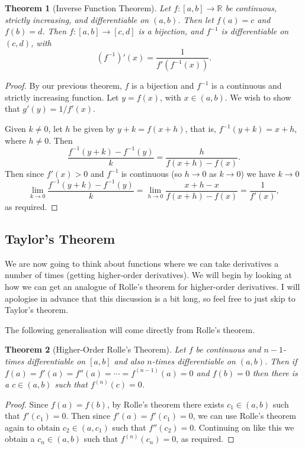 \documentclass[11pt, a4paper]{article}
\newtheorem{theorem}{Theorem}[section]
\theoremstyle{definition}
\newcommand{\R}{\mathbb{R}}
\begin{document}
\begin{theorem}[Inverse Function Theorem]
	Let $f:[a, b] \rightarrow \R$ be continuous, strictly increasing, and differentiable on $(a, b)$.
	Then let $f(a) = c$ and $f(b) = d$. Then $f:[a, b] \rightarrow [c, d]$ is a bijection, and $f^{-1}$ is differentiable on $(c, d)$, with
	$$
	(f^{-1})'(x) = \frac{1}{f'(f^{-1}(x))}.
	$$
\end{theorem}
\begin{proof}
	By our previous theorem, $f$ is a bijection and $f^{-1}$ is a continuous and strictly increasing function. Let $y = f(x)$, with $x \in (a, b)$. We wish to show that $g'(y) = 1/f'(x)$.

	Given $k \neq 0$, let $h$ be given by $y + k = f(x + h)$, that is, $f^{-1}(y + k) = x + h$, where $h \neq 0$. Then
	$$
	\frac{f^{-1}(y + k) - f^{-1}(y)}{k} = \frac{h}{f(x + h) - f(x)}.
	$$
	Then since $f'(x) > 0$ and $f^{-1}$ is continuous (so $h \rightarrow 0$ as $k \rightarrow 0$) we have $k \to 0$ 
	$$
	\lim_{k \to 0} \frac{f^{-1}(y + k) - f^{-1}(y)}{k} = \lim_{h \to 0} \frac{x + h - x}{f(x + h) - f(x)} = \frac{1}{f'(x)},
	$$
	as required.
\end{proof}

\subsection{Taylor's Theorem}

We are now going to think about functions where we can take derivatives a number of times (getting higher-order derivatives).
We will begin by looking at how we can get an analogue of Rolle's theorem for higher-order derivatives. I will apologise in advance that this discussion is a bit long, so feel free to just skip to Taylor's theorem.

The following generalisation will come directly from Rolle's theorem.
\begin{theorem}[Higher-Order Rolle's Theorem]
	Let $f$ be continuous and $n-1$-times differentiable on $[a, b]$ and also $n$-times differentiable on $(a, b)$. Then if $f(a) = f'(a) = f''(a) = \cdots = f^{(n - 1)}(a) = 0$ and $f(b) = 0$ then there is a $c \in (a, b)$ such that $f^{(n)}(c) = 0$.
\end{theorem}
\begin{proof}
	Since $f(a) = f(b)$, by Rolle's theorem there exists $c_1 \in (a, b)$ such that $f'(c_1) = 0$. Then since $f'(a) = f'(c_1) = 0$, we can use Rolle's theorem again to obtain $c_2 \in (a, c_1)$ such that $f''(c_2) = 0$. Continuing on like this we obtain a $c_{n} \in (a, b)$ such that $f^{(n)}(c_n) = 0$, as required.
\end{proof}
\end{document}
